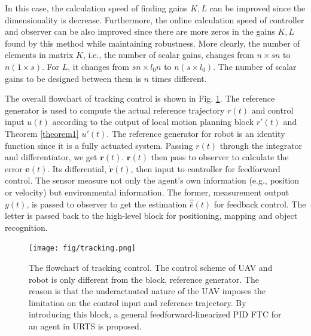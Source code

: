 \documentclass{ieeeaccess}
\newtheorem{remark}{Remark}
\begin{document}
In this case, the calculation speed of finding gains $K,L$ can be improved since the dimensionality is decrease. Furthermore, the online calculation speed of controller and observer can be also improved since there are more zeros in the gains $K,L$ found by this method while maintaining robustness. More clearly, the number of elements in matrix $K$, i.e., the number of scalar gains, changes from $n\times sn$ to $n(1\times s)$. For $L$, it changes from $sn\times l_0n$ to $n(s\times l_0)$. The number of scalar gains to be designed between them is $n$ times different.

The overall flowchart of tracking control is shown in Fig. \ref{fig:tracking}. The reference generator is used to compute the actual reference trajectory $r(t)$ and control input $u(t)$ according to the output of local motion planning block $r'(t)$ and Theorem \ref{theorem1} $u'(t)$. The reference generator for robot is an identity function since it is a fully actuated system. Passing $r(t)$ through the integrator and differentiator, we get $\pmb{r}(t)$. $\pmb{r}(t)$ then pass to observer to calculate the error $\pmb{e}(t)$. Its differential, $\dot{\pmb{r}}(t)$, then input to controller for feedforward control. The sensor measure not only the agent's own information (e.g., position or velocity) but environmental information. The former, measurement output $y(t)$, is passed to observer to get the estimation $\hat{\bar{e}}(t)$ for feedback control. The letter is passed back to the high-level block for positioning, mapping and object recognition.

\begin{figure}[htbp]
    \centering
    \texttt{[image: fig/tracking.png]}\caption{The flowchart of tracking control. The control scheme of UAV and robot is only different from the block, reference generator. The reason is that the underactuated nature of the UAV imposes the limitation on the control input and reference trajectory. By introducing this block, a general feedforward-linearized PID FTC for an agent in URTS is proposed.}%
    \label{fig:tracking}
\end{figure}
\end{document}
